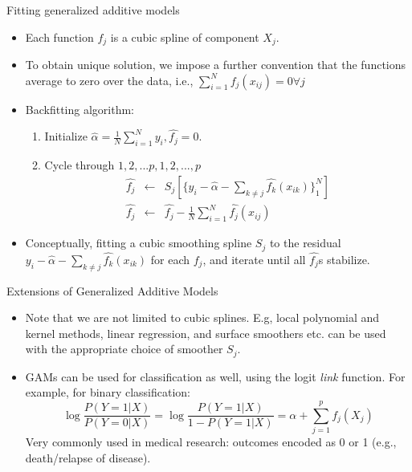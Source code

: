 \documentclass[aspectratio=169]{beamer}
\begin{document}
\begin{frame}{Fitting generalized additive models}
    \begin{itemize}
        \item Each function $f_j$ is a cubic spline of component $X_j$.
        \item To obtain unique solution, we impose a further convention that the functions average to zero over the data, i.e., $\sum_{i=1}^N f_j(x_{ij}) = 0 \forall j$
        \item Backfitting algorithm:
        \begin{enumerate}
            \item Initialize $\hat{\alpha} = \frac{1}{N} \sum_{i=1}^N y_i, \hat{f_j} = 0$.
            \item Cycle through $1, 2, ... p, 1, 2, ..., p$
            \begin{eqnarray*}
                \hat{f_j} & \longleftarrow & S_j\left[ \{y_i - \hat{\alpha} - \sum_{k\neq j} \hat{f_k}(x_{ik})\}_1^N \right]\\
                \hat{f_j} &\longleftarrow & \hat{f_j} - \frac{1}{N} \sum_{i=1}^N \hat{f_j}(x_{ij})
            \end{eqnarray*}
        \end{enumerate}
        \item Conceptually, fitting a cubic smoothing spline $S_j$ to the residual $y_i - \hat{\alpha} - \sum_{k\neq j} \hat{f_k}(x_{ik})$ for each $f_j$, and iterate until all $\hat{f_j}$s stabilize.  
    \end{itemize}
\end{frame}


\begin{frame}{Extensions of Generalized Additive Models}
    \begin{itemize}
        \item Note that we are not limited to cubic splines. E.g, local polynomial and kernel methods, linear regression, and surface smoothers etc. can be used with the appropriate choice of smoother $S_j$.
        \item GAMs can be used for classification as well, using the logit \textit{link} function. For example, for binary classification:
        \begin{equation*}
            \log{\frac{P(Y=1|X)}{P(Y=0|X)}} = \log{\frac{P(Y=1|X)}{1-P(Y=1|X)}} =  \alpha + \sum_{j=1}^p f_j(X_j)
        \end{equation*}
        Very commonly used in medical research: outcomes encoded as 0 or 1 (e.g., death/relapse of disease).
    \end{itemize}
\end{frame}
\end{document}
